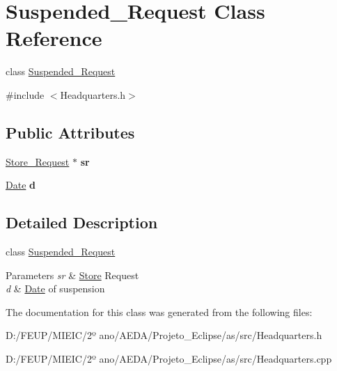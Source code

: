 \hypertarget{class_suspended___request}{}\section{Suspended\+\_\+\+Request Class Reference}
\label{class_suspended___request}


class \hyperlink{class_suspended___request}{Suspended\+\_\+\+Request}  




{\ttfamily \#include $<$Headquarters.\+h$>$}

\subsection*{Public Attributes}
\begin{DoxyCompactItemize}
\item 
\mbox{\label{class_suspended___request_ac7951124f94d473eb66c02b2da3fa9b6}} 
\hyperlink{class_store___request}{Store\+\_\+\+Request} $\ast$ {\bfseries sr}
\item 
\mbox{\label{class_suspended___request_a69dd07971406e6bd8a01d10d708c96c1}} 
\hyperlink{class_date}{Date} {\bfseries d}
\end{DoxyCompactItemize}


\subsection{Detailed Description}
class \hyperlink{class_suspended___request}{Suspended\+\_\+\+Request} 


\begin{DoxyParams}{Parameters}
{\em sr} & \hyperlink{class_store}{Store} Request\\
\hline
{\em d} & \hyperlink{class_date}{Date} of suspension \\
\hline
\end{DoxyParams}


The documentation for this class was generated from the following files\+:\begin{DoxyCompactItemize}
\item 
D\+:/\+F\+E\+U\+P/\+M\+I\+E\+I\+C/2º ano/\+A\+E\+D\+A/\+Projeto\+\_\+\+Eclipse/as/src/Headquarters.\+h\item 
D\+:/\+F\+E\+U\+P/\+M\+I\+E\+I\+C/2º ano/\+A\+E\+D\+A/\+Projeto\+\_\+\+Eclipse/as/src/Headquarters.\+cpp\end{DoxyCompactItemize}
